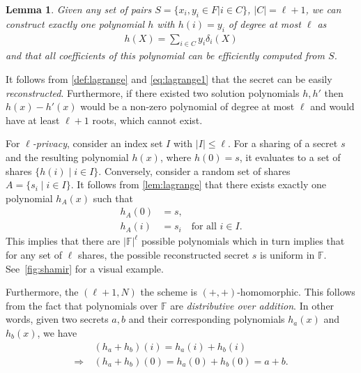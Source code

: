 \documentclass[11pt]{report}
\theoremstyle{definition}
\theoremstyle{plain}
\newtheorem{lemma}{Lemma}[section]
\begin{document}
\begin{lemma}\label{lem:lagrange}
  Given any set of pairs $S = \{x_i, y_i \in F| i \in C\}$, $|C| = \ell + 1$, we can construct exactly one polynomial $h$ with $h(i) = y_i$ of degree at most $\ell$ as
  \begin{align*}
    h(X) = \sum_{i \in C} y_i \delta_i(X)
  \end{align*}
  \noindent and that all coefficients of this polynomial can be efficiently computed from $S$.
\end{lemma}

It follows from \autoref{def:lagrange} and \autoref{eq:lagrange1} that the secret can be easily \textit{reconstructed}. Furthermore, if there existed two solution polynomials $h, h'$ then $h(x) - h'(x)$ would be a non-zero polynomial of degree at most $\ell$ and would have at least $\ell + 1$ roots, which cannot exist.

For \textit{$\ell$-privacy}, consider an index set $I$ with $|I| \leq \ell$. For a sharing of a secret $s$ and the resulting polynomial $h(x)$, where $h(0) = s$, it evaluates to a set of shares $\{h(i) \mid i \in I\}$.
Conversely, consider a random set of shares $A = \{s_i \mid i \in I\}$. It follows from \autoref{lem:lagrange} that there exists exactly one polynomial $h_A(x)$ such that
\begin{align*}
  h_A(0) & = s,                                 \\
  h_A(i) & = s_i \quad \text{for all } i \in I.
\end{align*}
This implies that there are $|\mathbb{F}|^\ell$ possible polynomials which in turn implies that for any set of $\ell$ shares, the possible reconstructed secret $s$ is uniform in $\mathbb{F}$. See~\autoref{fig:shamir} for a visual example.

Furthermore, the $(\ell + 1, N)$ the scheme is $(+, +)$-homomorphic. This follows from the fact that polynomials over $\mathbb{F}$ are \textit{distributive over addition}. In other words, given two secrets $a, b$ and their corresponding polynomials $h_a(x)$ and $h_b(x)$, we have
\begin{align*}
                & (h_a + h_b)(i) = h_a(i) + h_b(i)          \\
  \Rightarrow\  & (h_a + h_b)(0) = h_a(0) + h_b(0) = a + b.
\end{align*}
\end{document}

